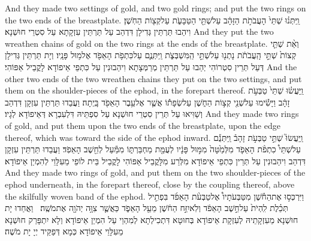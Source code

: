 {And they made two settings of gold, and two gold rings; and put the two rings on the two ends of the breastplate.}{}
{וַֽיִּתְּנ֗וּ שְׁתֵּי֙ הָעֲבֹתֹ֣ת הַזָּהָ֔ב עַל\maqqaf שְׁתֵּ֖י הַטַּבָּעֹ֑ת עַל\maqqaf קְצ֖וֹת הַחֹֽשֶׁן׃}
{וִיהַבוּ תַּרְתֵּין גְּדִילָן דִּדְהַב עַל תַּרְתֵּין עִזְקָתָא עַל סִטְרֵי חוּשְׁנָא׃}
{And they put the two wreathen chains of gold on the two rings at the ends of the breastplate.}{}
{וְאֵ֨ת שְׁתֵּ֤י קְצוֹת֙ שְׁתֵּ֣י הָֽעֲבֹתֹ֔ת נָתְנ֖וּ עַל\maqqaf שְׁתֵּ֣י הַֽמִּשְׁבְּצֹ֑ת וַֽיִּתְּנֻ֛ם עַל\maqqaf כִּתְפֹ֥ת הָאֵפֹ֖ד אֶל\maqqaf מ֥וּל פָּנָֽיו׃}
{וְיָת תַּרְתֵּין גְּדִילָן דְּעַל תְּרֵין סִטְרוֹהִי יְהַבוּ עַל תַּרְתֵּין מְרַמְּצָתָא וִיהַבוּנִין עַל כִּתְפֵי אֵיפוֹדָא לָקֳבֵיל אַפּוֹהִי׃}
{And the other two ends of the two wreathen chains they put on the two settings, and put them on the shoulder-pieces of the ephod, in the forepart thereof.}{}
{וַֽיַּעֲשׂ֗וּ שְׁתֵּי֙ טַבְּעֹ֣ת זָהָ֔ב וַיָּשִׂ֕ימוּ עַל\maqqaf שְׁנֵ֖י קְצ֣וֹת הַחֹ֑שֶׁן עַל\maqqaf שְׂפָת֕וֹ אֲשֶׁ֛ר אֶל\maqqaf עֵ֥בֶר הָאֵפֹ֖ד בָּֽיְתָה׃}
{וַעֲבַדוּ תַּרְתֵּין עִזְקָן דִּדְהַב וְשַׁוִּיאוּ עַל תְּרֵין סִטְרֵי חוּשְׁנָא עַל סִפְתֵּיהּ דִּלְעִבְרָא דְּאֵיפוֹדָא לְגָיו׃}
{And they made two rings of gold, and put them upon the two ends of the breastplate, upon the edge thereof, which was toward the side of the ephod inward.}{}
{וַֽיַּעֲשׂוּ֮ שְׁתֵּ֣י טַבְּעֹ֣ת זָהָב֒ וַֽיִּתְּנֻ֡ם עַל\maqqaf שְׁתֵּי֩ כִתְפֹ֨ת הָאֵפֹ֤ד מִלְּמַ֙טָּה֙ מִמּ֣וּל פָּנָ֔יו לְעֻמַּ֖ת מַחְבַּרְתּ֑וֹ מִמַּ֕עַל לְחֵ֖שֶׁב הָאֵפֹֽד׃}
{וַעֲבַדוּ תַּרְתֵּין עִזְקָן דִּדְהַב וִיהַבוּנִין עַל תְּרֵין כִּתְפֵי אֵיפוֹדָא מִלְּרַע מִלָּקֳבֵיל אַפּוֹהִי לָקֳבֵיל בֵּית לוֹפֵי מֵעִלָּוֵי לְהִמְיַן אֵיפוֹדָא׃}
{And they made two rings of gold, and put them on the two shoulder-pieces of the ephod underneath, in the forepart thereof, close by the coupling thereof, above the skilfully woven band of the ephod.}{}
{וַיִּרְכְּס֣וּ אֶת\maqqaf הַחֹ֡שֶׁן מִטַּבְּעֹתָיו֩ אֶל\maqqaf טַבְּעֹ֨ת הָאֵפֹ֜ד בִּפְתִ֣יל תְּכֵ֗לֶת לִֽהְיֹת֙ עַל\maqqaf חֵ֣שֶׁב הָאֵפֹ֔ד וְלֹֽא\maqqaf יִזַּ֣ח הַחֹ֔שֶׁן מֵעַ֖ל הָאֵפֹ֑ד כַּאֲשֶׁ֛ר צִוָּ֥ה יְהֹוָ֖ה אֶת\maqqaf מֹשֶֽׁה׃ \petucha }
{וַאֲחַדוּ יָת חוּשְׁנָא מֵעִזְקָתֵיהּ לְעִזְקָת אֵיפוֹדָא בְּחוּטָא דִּתְכִילְתָא לְמִהְוֵי עַל הִמְיַן אֵיפוֹדָא וְלָא יִתְפָּרַק חוּשְׁנָא מֵעִלָּוֵי אֵיפוֹדָא כְּמָא דְּפַקֵּיד יְיָ יָת מֹשֶׁה׃}

